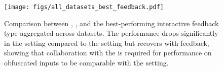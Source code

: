 \begin{figure}[t]
    \texttt{[image: figs/all\_datasets\_best\_feedback.pdf]}
    \caption{
        Comparison between \vanilla, \baseline, and the best-performing interactive feedback type aggregated across datasets. The performance drops significantly in the \baseline{} setting compared to the \vanilla{} setting but recovers with feedback, showing that collaboration with the \user{} is required for performance on obfuscated inputs to be comparable with the \vanilla{} setting.
    }
    \vspace{-5pt}
    
    \label{fig:vanilla_baseline}
\end{figure}
